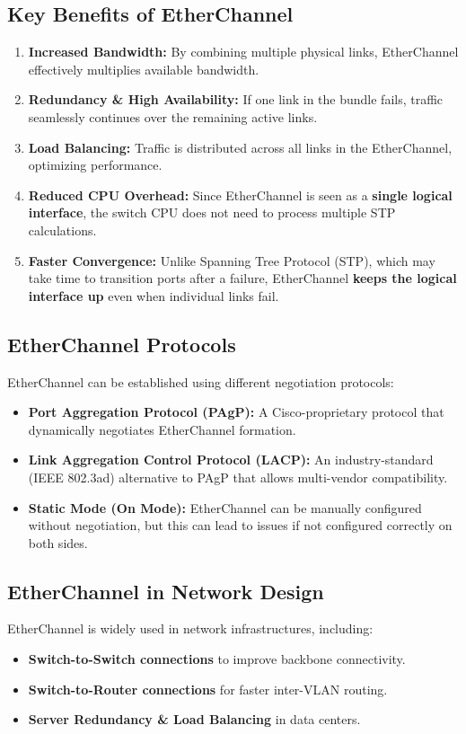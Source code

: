 \documentclass[a4paper]{article}
\begin{document}
\subsection{Key Benefits of EtherChannel}
\begin{enumerate}
    \item \textbf{Increased Bandwidth:} By combining multiple physical links, EtherChannel effectively multiplies available bandwidth.
    \item \textbf{Redundancy \& High Availability:} If one link in the bundle fails, traffic seamlessly continues over the remaining active links.
    \item \textbf{Load Balancing:} Traffic is distributed across all links in the EtherChannel, optimizing performance.
    \item \textbf{Reduced CPU Overhead:} Since EtherChannel is seen as a \textbf{single logical interface}, the switch CPU does not need to process multiple STP calculations.
    \item \textbf{Faster Convergence:} Unlike Spanning Tree Protocol (STP), which may take time to transition ports after a failure, EtherChannel \textbf{keeps the logical interface up} even when individual links fail.
\end{enumerate}

\subsection{EtherChannel Protocols}
EtherChannel can be established using different negotiation protocols:
\begin{itemize}
    \item \textbf{Port Aggregation Protocol (PAgP):} A Cisco-proprietary protocol that dynamically negotiates EtherChannel formation.
    \item \textbf{Link Aggregation Control Protocol (LACP):} An industry-standard (IEEE 802.3ad) alternative to PAgP that allows multi-vendor compatibility.
    \item \textbf{Static Mode (On Mode):} EtherChannel can be manually configured without negotiation, but this can lead to issues if not configured correctly on both sides.
\end{itemize}

\subsection{EtherChannel in Network Design}
EtherChannel is widely used in network infrastructures, including:
\begin{itemize}
    \item \textbf{Switch-to-Switch connections} to improve backbone connectivity.
    \item \textbf{Switch-to-Router connections} for faster inter-VLAN routing.
    \item \textbf{Server Redundancy \& Load Balancing} in data centers.
\end{itemize}
\end{document}
